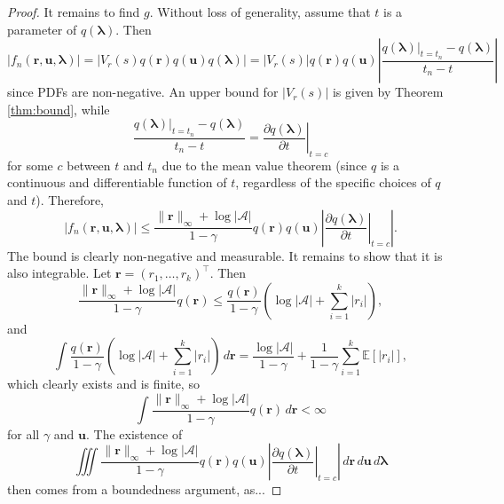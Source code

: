 \documentclass{article}
\theoremstyle{definition}
\newcommand{\fn}{f_n(\mathbf{r}, \mathbf{u}, \bm\lambda)}
\newcommand{\dx}{\,d\mathbf{r}\,d\mathbf{u}\,d\bm\lambda}
\newcommand{\rinf}{\lVert \mathbf{r} \rVert_\infty}
\newcommand{\vbound}{\frac{\rinf + \log|\mathcal{A}|}{1 - \gamma}}
\begin{document}
\begin{proof}
  It remains to find $g$. Without loss of generality, assume that $t$ is a
  parameter of $q(\bm\lambda)$. Then
  \[ |\fn| = |V_r(s)q(\mathbf{r})q(\mathbf{u})q(\bm\lambda)| =
    |V_r(s)|q(\mathbf{r})q(\mathbf{u}) \left| \frac{q(\bm\lambda)|_{t = t_n} -
        q(\bm\lambda)}{t_n - t} \right| \]
  since PDFs are non-negative. An upper bound for
  $|V_r(s)|$ is given by Theorem \ref{thm:bound}, while
  \[ \frac{q(\bm\lambda)|_{t = t_n} - q(\bm\lambda)}{t_n - t} = \left.
      \frac{\partial q(\bm\lambda)}{\partial t} \right|_{t = c} \]
  for some $c$ between $t$ and $t_n$ due to the mean value theorem (since $q$ is
  a continuous and differentiable function of $t$, regardless of the specific
  choices of $q$ and $t$). %
  Therefore,
  \[ |\fn| \le \vbound q(\mathbf{r})q(\mathbf{u}) \left| \left. \frac{\partial
        q(\bm\lambda)}{\partial t} \right|_{t=c} \right|. \]
The bound is clearly non-negative and measurable. It remains to show that it is
also integrable. Let $\mathbf{r} = (r_1, \dots, r_k)^\intercal$. Then
\[ \vbound q(\mathbf{r}) \le \frac{q(\mathbf{r})}{1 - \gamma} \left(
    \log|\mathcal{A}| + \sum_{i=1}^k |r_i| \right), \]
and
\[ \int \frac{q(\mathbf{r})}{1 - \gamma} \left(\log|\mathcal{A}| + \sum_{i=1}^k
    |r_i| \right)\,d\mathbf{r} = \frac{\log|\mathcal{A}|}{1 - \gamma} +
  \frac{1}{1 - \gamma} \sum_{i=1}^k \mathbb{E}[|r_i|], \]
which clearly exists and is finite, so
\[ \int \vbound q(\mathbf{r}) \,d\mathbf{r} < \infty \]
for all $\gamma$ and $\mathbf{u}$. The existence of
\[ \iiint \vbound q(\mathbf{r})q(\mathbf{u}) \left| \left. \frac{\partial
        q(\bm\lambda)}{\partial t} \right|_{t=c} \right|\dx \]
then comes from a boundedness argument, as...
\end{proof}
\end{document}
